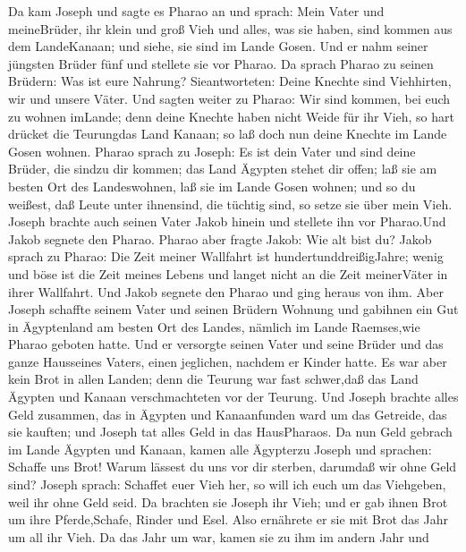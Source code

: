  Da kam Joseph und sagte es Pharao an und sprach: Mein Vater
und meineBrüder, ihr klein und groß Vieh und alles, was sie haben, sind
kommen aus dem LandeKanaan; und siehe, sie sind im Lande Gosen.
 Und er nahm seiner jüngsten Brüder fünf und stellete sie
vor Pharao.  Da sprach Pharao zu seinen Brüdern: Was ist
eure Nahrung? Sieantworteten: Deine Knechte sind Viehhirten, wir und
unsere Väter.  Und sagten weiter zu Pharao: Wir sind kommen,
bei euch zu wohnen imLande; denn deine Knechte haben nicht Weide für ihr
Vieh, so hart drücket die Teurungdas Land Kanaan; so laß doch nun deine
Knechte im Lande Gosen wohnen.  Pharao sprach zu Joseph: Es
ist dein Vater und sind deine Brüder, die sindzu dir kommen;
 das Land Ägypten stehet dir offen; laß sie am besten Ort
des Landeswohnen, laß sie im Lande Gosen wohnen; und so du weißest, daß
Leute unter ihnensind, die tüchtig sind, so setze sie über mein Vieh.
 Joseph brachte auch seinen Vater Jakob hinein und stellete
ihn vor Pharao.Und Jakob segnete den Pharao.  Pharao aber
fragte Jakob: Wie alt bist du?  Jakob sprach zu Pharao: Die
Zeit meiner Wallfahrt ist hundertunddreißigJahre; wenig und böse ist die
Zeit meines Lebens und langet nicht an die Zeit meinerVäter in ihrer
Wallfahrt.  Und Jakob segnete den Pharao und ging heraus
von ihm.  Aber Joseph schaffte seinem Vater und seinen
Brüdern Wohnung und gabihnen ein Gut in Ägyptenland am besten Ort des
Landes, nämlich im Lande Raemses,wie Pharao geboten hatte. 
Und er versorgte seinen Vater und seine Brüder und das ganze Hausseines
Vaters, einen jeglichen, nachdem er Kinder hatte.  Es war
aber kein Brot in allen Landen; denn die Teurung war fast schwer,daß das
Land Ägypten und Kanaan verschmachteten vor der Teurung. 
Und Joseph brachte alles Geld zusammen, das in Ägypten und Kanaanfunden
ward um das Getreide, das sie kauften; und Joseph tat alles Geld in das
HausPharaos.  Da nun Geld gebrach im Lande Ägypten und
Kanaan, kamen alle Ägypterzu Joseph und sprachen: Schaffe uns Brot!
Warum lässest du uns vor dir sterben, darumdaß wir ohne Geld sind?
 Joseph sprach: Schaffet euer Vieh her, so will ich euch um
das Viehgeben, weil ihr ohne Geld seid.  Da brachten sie
Joseph ihr Vieh; und er gab ihnen Brot um ihre Pferde,Schafe, Rinder und
Esel. Also ernährete er sie mit Brot das Jahr um all ihr Vieh.
 Da das Jahr um war, kamen sie zu ihm im andern Jahr und
